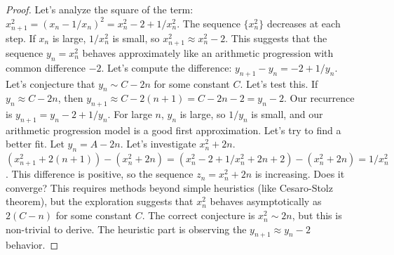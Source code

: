 \begin{enumerate}
    \begin{proof}
    Let's analyze the square of the term:
    $x_{n+1}^2 = (x_n - 1/x_n)^2 = x_n^2 - 2 + 1/x_n^2$.
    The sequence $\{x_n^2\}$ decreases at each step. If $x_n$ is large, $1/x_n^2$ is small, so $x_{n+1}^2 \approx x_n^2 - 2$.
    This suggests that the sequence $y_n = x_n^2$ behaves approximately like an arithmetic progression with common difference $-2$.
    Let's compute the difference: $y_{n+1} - y_n = -2 + 1/y_n$.
    Let's conjecture that $y_n \sim C - 2n$ for some constant $C$.
    Let's test this. If $y_n \approx C-2n$, then $y_{n+1} \approx C-2(n+1) = C-2n-2 = y_n - 2$.
    Our recurrence is $y_{n+1} = y_n - 2 + 1/y_n$. For large $n$, $y_n$ is large, so $1/y_n$ is small, and our arithmetic progression model is a good first approximation.
    Let's try to find a better fit. Let $y_n = A - 2n$. Let's investigate $x_n^2 + 2n$.
    $(x_{n+1}^2 + 2(n+1)) - (x_n^2 + 2n) = (x_n^2 - 2 + 1/x_n^2 + 2n + 2) - (x_n^2 + 2n) = 1/x_n^2$.
    This difference is positive, so the sequence $z_n = x_n^2+2n$ is increasing. Does it converge?
    This requires methods beyond simple heuristics (like Cesaro-Stolz theorem), but the exploration suggests that $x_n^2$ behaves asymptotically as $2(C-n)$ for some constant $C$. The correct conjecture is $x_n^2 \sim 2n$, but this is non-trivial to derive. The heuristic part is observing the $y_{n+1} \approx y_n-2$ behavior.
    \end{proof}

\end{enumerate}


